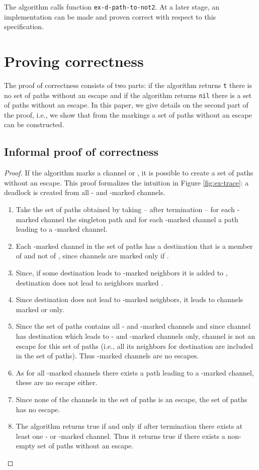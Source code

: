 \documentclass[submission,copyright]{eptcs}
\begin{document}
The algorithm calls function {\tt ex-d-path-to-not2}. At a later stage, an implementation can be made and proven correct with respect to this specification.

\section{Proving correctness}\label{sec:proof}

The proof of correctness consists of two parts: if the algorithm returns {\tt t} there is no set of paths without an escape and if the algorithm returns {\tt nil} there is a set of paths without an escape. In this paper, we give details on the second part of the proof, i.e., we show that from the markings a set of paths without an escape can be constructed.

\subsection{Informal proof of correctness}

\begin{proof}
If the algorithm marks a channel  or , it is possible to create a set of paths without an escape. This proof formalizes the intuition in Figure \ref{fig:ex-trace}: a deadlock is created from all - and -marked channels. 
\begin{enumerate}
\item Take the set of paths  obtained by taking -- after termination -- for each -marked channel  the singleton path  and for each -marked channel a path leading to a -marked channel.
\item Each -marked channel  in the set of paths  has a destination  that is a member of  and not of , since channels are marked  only if .
\item Since, if some destination leads to -marked neighbors it is added to , destination  does not lead to neighbors marked .
\item Since destination  does not lead to -marked neighbors, it leads to channels marked  or  only.
\item Since the set of paths  contains all - and -marked channels and since channel  has destination  which leads to - and -marked channels only, channel  is not an escape for this set of paths (i.e., all its neighbors for destination  are included in the set of paths). Thus -marked channels are no escapes.
\item As for all -marked channels there exists a path leading to a -marked channel, these are no escape either.
\item Since none of the channels in the set of paths  is an escape, the set of paths has no escape.
\item The algorithm returns true if and only if after termination there exists at least one - or -marked channel. Thus it returns true if there exists a non-empty set of paths without an escape.
\end{enumerate}
\end{proof}
\end{document}
